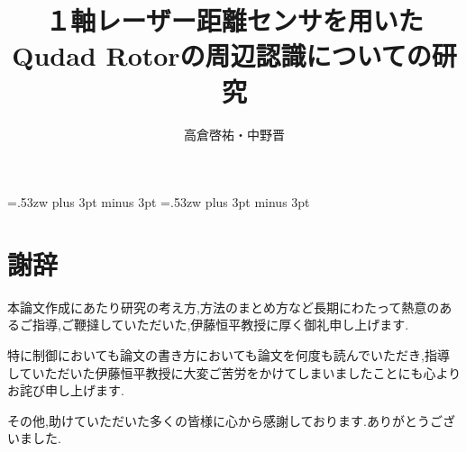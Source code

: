 \documentclass[12pt,oneside]{paper}
\title{１軸レーザー距離センサを用いたQudad Rotorの周辺認識についての研究}
\author{高倉啓祐・中野晋}
\begin{document}
\setlength{\baselineskip}{9truemm}

\kanjiskip=.53zw plus 3pt minus 3pt
\xkanjiskip=.53zw plus 3pt minus 3pt

\tableofcontents

















\chapter*{謝辞}
本論文作成にあたり研究の考え方,方法のまとめ方など長期にわたって熱意のあるご指導,ご鞭撻していただいた,伊藤恒平教授に厚く御礼申し上げます.

特に制御においても論文の書き方においても論文を何度も読んでいただき,指導していただいた伊藤恒平教授に大変ご苦労をかけてしまいましたことにも心よりお詫び申し上げます.

その他,助けていただいた多くの皆様に心から感謝しております.ありがとうございました.


\end{document}
